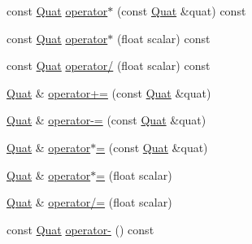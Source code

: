 \begin{DoxyCompactItemize}
\item 
const \hyperlink{classVectormath_1_1Aos_1_1Quat}{Quat} \hyperlink{classVectormath_1_1Aos_1_1Quat_af70bf3713a385bccbfd0e02d5033f50f}{operator$\ast$} (const \hyperlink{classVectormath_1_1Aos_1_1Quat}{Quat} \&quat) const 
\item 
const \hyperlink{classVectormath_1_1Aos_1_1Quat}{Quat} \hyperlink{classVectormath_1_1Aos_1_1Quat_adadc8d0019d4323e6bf39298090cdca3}{operator$\ast$} (float scalar) const 
\item 
const \hyperlink{classVectormath_1_1Aos_1_1Quat}{Quat} \hyperlink{classVectormath_1_1Aos_1_1Quat_ab42b4340a23dfb2660a513bf42c16a0e}{operator/} (float scalar) const 
\item 
\hyperlink{classVectormath_1_1Aos_1_1Quat}{Quat} \& \hyperlink{classVectormath_1_1Aos_1_1Quat_acada50f52962864a653ab62e22f79191}{operator+=} (const \hyperlink{classVectormath_1_1Aos_1_1Quat}{Quat} \&quat)
\item 
\hyperlink{classVectormath_1_1Aos_1_1Quat}{Quat} \& \hyperlink{classVectormath_1_1Aos_1_1Quat_abba2bc95bac997e9d643e99d7e170466}{operator-\/=} (const \hyperlink{classVectormath_1_1Aos_1_1Quat}{Quat} \&quat)
\item 
\hyperlink{classVectormath_1_1Aos_1_1Quat}{Quat} \& \hyperlink{classVectormath_1_1Aos_1_1Quat_a21c31c4bf5cce9a8266a02d168b7eedf}{operator$\ast$=} (const \hyperlink{classVectormath_1_1Aos_1_1Quat}{Quat} \&quat)
\item 
\hyperlink{classVectormath_1_1Aos_1_1Quat}{Quat} \& \hyperlink{classVectormath_1_1Aos_1_1Quat_a529954f9867e8949f2ff5fb46b36d14c}{operator$\ast$=} (float scalar)
\item 
\hyperlink{classVectormath_1_1Aos_1_1Quat}{Quat} \& \hyperlink{classVectormath_1_1Aos_1_1Quat_a9aca527ac1565fca86151d9e1b5921f0}{operator/=} (float scalar)
\item 
const \hyperlink{classVectormath_1_1Aos_1_1Quat}{Quat} \hyperlink{classVectormath_1_1Aos_1_1Quat_ac98a921fa0caecefd842fef175f84f9b}{operator-\/} () const 
\end{DoxyCompactItemize}
